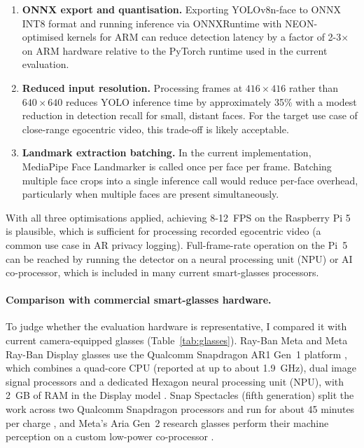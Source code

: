 \begin{enumerate}
  \item \textbf{ONNX export and quantisation.} Exporting YOLOv8n-face to ONNX INT8
        format and running inference via ONNXRuntime with NEON-optimised kernels for
        ARM can reduce detection latency by a factor of 2-3$\times$ on ARM hardware
        relative to the PyTorch runtime used in the current evaluation.

  \item \textbf{Reduced input resolution.} Processing frames at $416 \times 416$
        rather than $640 \times 640$ reduces YOLO inference time by approximately
        35\% with a modest reduction in detection recall for small, distant faces.
        For the target use case of close-range egocentric video, this trade-off is
        likely acceptable.

  \item \textbf{Landmark extraction batching.} In the current implementation,
        MediaPipe Face Landmarker is called once per face per frame. Batching
        multiple face crops into a single inference call would reduce per-face
        overhead, particularly when multiple faces are present simultaneously.
\end{enumerate}

With all three optimisations applied, achieving 8-12~FPS on the Raspberry Pi 5 is
plausible, which is sufficient for processing recorded egocentric video (a common
use case in AR privacy logging). Full-frame-rate operation on the Pi~5 can be reached by
running the detector on a neural processing unit (NPU) or AI co-processor, which
is included in many current smart-glasses processors.

\paragraph{Comparison with commercial smart-glasses hardware.}
To judge whether the evaluation hardware is representative, I compared it with
current camera-equipped glasses (Table~\ref{tab:glasses}). Ray-Ban Meta and Meta
Ray-Ban Display glasses use the Qualcomm Snapdragon AR1 Gen~1 platform
\cite{ref:qcom_ar1}, which combines a quad-core CPU (reported at up to about
1.9~GHz), dual image signal processors and a dedicated Hexagon neural processing unit
(NPU), with 2~GB of RAM in the Display model \cite{ref:gsmarena_display}. Snap
Spectacles (fifth generation) split the work across two Qualcomm Snapdragon processors
and run for about 45 minutes per charge \cite{ref:spectacles5}, and Meta's Aria
Gen~2 research glasses perform their machine perception on a custom low-power
co-processor \cite{ref:aria2}.

